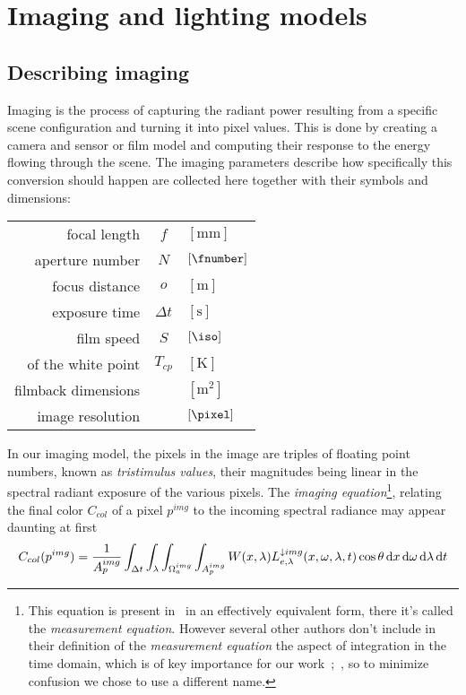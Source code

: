 
\chapter{Imaging and lighting models}\label{ch:lighting}
\section{Describing imaging}\label{ch:imaging}

Imaging is the process of capturing the \gls{radiant power} resulting 
from a specific \gls{scene} configuration and turning it into pixel values. 
This is done by creating a camera and sensor or film model and computing 
their response to the energy flowing through the scene.
The imaging parameters describe how specifically this conversion should happen 
are collected here together with their symbols and dimensions:

\vskip 2mm
\begin{center}
\begin{tabular}{r c l}
	focal length        & $f$ & $[\unit{\milli\meter}]$ \\
	aperture number     & $N$ & $[\unit{\fnumber}]$ \\
	focus distance      & $o$ & $[\unit{\meter}]$ \\
	exposure time       & $\Delta t$ & $[\unit{\second}]$ \\
	film speed          & $S$ & $[\unit{\iso}]$ \\
	\glsname{CCT} of the white point & $T_{cp}$ & $[\unit{\kelvin}]$ \\
	filmback dimensions &     & $[\unit{\square\meter}]$ \\
	image resolution    &     & $[\unit{\pixel}]$
\end{tabular}
\end{center}

\vskip 2mm

In our imaging model, the pixels in the image are triples of
floating point numbers, known as \textsl{\gls{tristimulus values}}, their
magnitudes being linear in the spectral radiant \gls{exposure} of the various
pixels. 
The \textsl{\gls{imaging equation}}\footnote{
	This equation is present in~\cite[Eq. 1]{kolb95} in an effectively equivalent form,
	there it's called the \emph{measurement equation}. 
	However several other authors don't include in their definition of the
	\emph{measurement equation} the aspect of integration in the time domain, which is
	of key importance for our work~\cite[p. 45, Eq 2.33]{dutre2003};~\cite{pharr2023}, 
	so to minimize confusion we chose to use a different name. 
}, relating the final color $C_{col}$ of a pixel
$p^{img}$ to the incoming \gls{spectral} \gls{radiance} may appear daunting at first
\begin{equation}\label{eqn:imaging1}
	C_{col}(p^{img})  = \frac1{A_p^{img}}
	\int_{\Delta t} \int_{\lambda} \int_{\Omega^{img}_a} \int_{A_p^{img}}
	  W(x, \lambda) L^{\downarrow
		img}_{e,\lambda}(x, \omega, \lambda, t) \cos\theta\mathop{}\!\mathrm{d} x\mathop{}\!\mathrm{d}\omega\mathop{}\!\mathrm{d}\lambda\mathop{}\!\mathrm{d} t
\end{equation}

